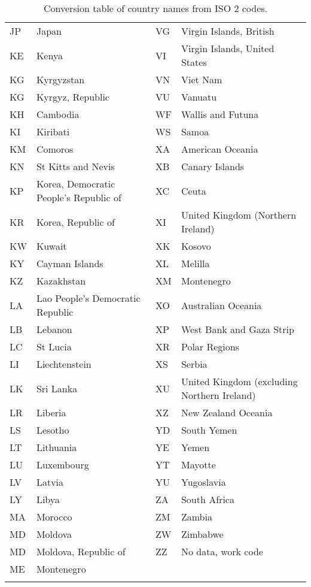 {\begin{longtable}{lp{5cm}||lp{5cm}}
 JP & Japan & VG & Virgin Islands, British \\
 KE & Kenya & VI & Virgin Islands, United States \\
 KG & Kyrgyzstan & VN & Viet Nam \\
 KG & Kyrgyz, Republic & VU & Vanuatu \\
 KH & Cambodia & WF & Wallis and Futuna \\
 KI & Kiribati & WS & Samoa \\
 KM & Comoros & XA & American Oceania \\
 KN & St Kitts and Nevis & XB & Canary Islands \\
 KP & Korea, Democratic People's Republic of & XC & Ceuta \\
 KR & Korea, Republic of & XI & United Kingdom (Northern Ireland) \\
 KW & Kuwait & XK & Kosovo \\
 KY & Cayman Islands & XL & Melilla \\
 KZ & Kazakhstan & XM & Montenegro \\
 LA & Lao People's Democratic Republic & XO & Australian Oceania \\
 LB & Lebanon & XP & West Bank and Gaza Strip \\
 LC & St Lucia & XR & Polar Regions \\
 LI & Liechtenstein & XS & Serbia \\
 LK & Sri Lanka & XU & United Kingdom (excluding Northern Ireland) \\
 LR & Liberia & XZ & New Zealand Oceania \\
 LS & Lesotho & YD & South Yemen \\
 LT & Lithuania & YE & Yemen \\
 LU & Luxembourg & YT & Mayotte \\
 LV & Latvia & YU & Yugoslavia \\
 LY & Libya & ZA & South Africa \\
 MA & Morocco & ZM & Zambia \\
 MD & Moldova & ZW & Zimbabwe \\
 MD & Moldova, Republic of & ZZ & No data, work code \\
 ME & Montenegro &  &  \\
 \caption{Conversion table of country names from ISO 2 codes.\label{tab:iso2}}
\end{longtable}
}
